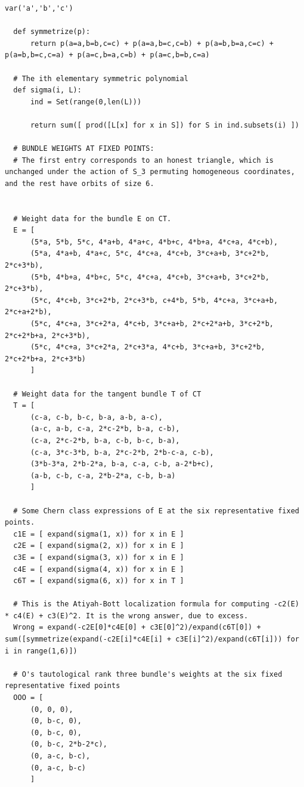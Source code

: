 \documentclass[reqno, 11pt]{amsart}
\theoremstyle{plain}
\theoremstyle{remark}
\begin{document}
\begin{lstlisting}[basicstyle=\ttfamily\tiny]  
  var('a','b','c')

  def symmetrize(p):
      return p(a=a,b=b,c=c) + p(a=a,b=c,c=b) + p(a=b,b=a,c=c) + p(a=b,b=c,c=a) + p(a=c,b=a,c=b) + p(a=c,b=b,c=a)
  
  # The ith elementary symmetric polynomial
  def sigma(i, L):
      ind = Set(range(0,len(L)))
      
      return sum([ prod([L[x] for x in S]) for S in ind.subsets(i) ])
  
  # BUNDLE WEIGHTS AT FIXED POINTS:
  # The first entry corresponds to an honest triangle, which is unchanged under the action of S_3 permuting homogeneous coordinates, and the rest have orbits of size 6.
  
  
  # Weight data for the bundle E on CT.
  E = [
      (5*a, 5*b, 5*c, 4*a+b, 4*a+c, 4*b+c, 4*b+a, 4*c+a, 4*c+b),
      (5*a, 4*a+b, 4*a+c, 5*c, 4*c+a, 4*c+b, 3*c+a+b, 3*c+2*b, 2*c+3*b),
      (5*b, 4*b+a, 4*b+c, 5*c, 4*c+a, 4*c+b, 3*c+a+b, 3*c+2*b, 2*c+3*b),
      (5*c, 4*c+b, 3*c+2*b, 2*c+3*b, c+4*b, 5*b, 4*c+a, 3*c+a+b, 2*c+a+2*b),
      (5*c, 4*c+a, 3*c+2*a, 4*c+b, 3*c+a+b, 2*c+2*a+b, 3*c+2*b, 2*c+2*b+a, 2*c+3*b),
      (5*c, 4*c+a, 3*c+2*a, 2*c+3*a, 4*c+b, 3*c+a+b, 3*c+2*b, 2*c+2*b+a, 2*c+3*b)
      ]
  
  # Weight data for the tangent bundle T of CT
  T = [
      (c-a, c-b, b-c, b-a, a-b, a-c),
      (a-c, a-b, c-a, 2*c-2*b, b-a, c-b),
      (c-a, 2*c-2*b, b-a, c-b, b-c, b-a),
      (c-a, 3*c-3*b, b-a, 2*c-2*b, 2*b-c-a, c-b),
      (3*b-3*a, 2*b-2*a, b-a, c-a, c-b, a-2*b+c),
      (a-b, c-b, c-a, 2*b-2*a, c-b, b-a)
      ]
  
  # Some Chern class expressions of E at the six representative fixed points.
  c1E = [ expand(sigma(1, x)) for x in E ]
  c2E = [ expand(sigma(2, x)) for x in E ]
  c3E = [ expand(sigma(3, x)) for x in E ]
  c4E = [ expand(sigma(4, x)) for x in E ]
  c6T = [ expand(sigma(6, x)) for x in T ]
  
  # This is the Atiyah-Bott localization formula for computing -c2(E) * c4(E) + c3(E)^2. It is the wrong answer, due to excess. 
  Wrong = expand(-c2E[0]*c4E[0] + c3E[0]^2)/expand(c6T[0]) + sum([symmetrize(expand(-c2E[i]*c4E[i] + c3E[i]^2)/expand(c6T[i])) for i in range(1,6)])
  
  # O's tautological rank three bundle's weights at the six fixed representative fixed points
  OOO = [
      (0, 0, 0),
      (0, b-c, 0),
      (0, b-c, 0),
      (0, b-c, 2*b-2*c),
      (0, a-c, b-c),
      (0, a-c, b-c)
      ]
  

\end{lstlisting}
\end{document}

